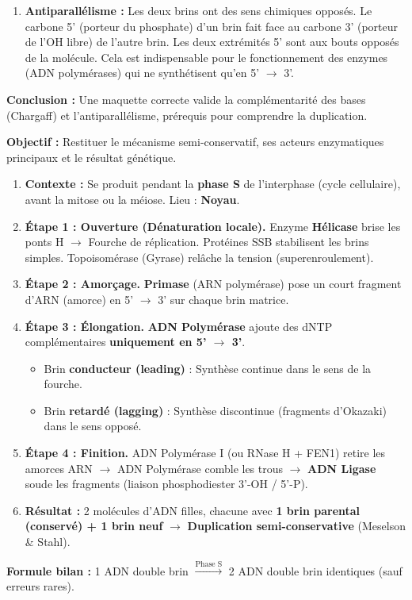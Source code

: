 \documentclass[11pt]{article}
\newcommand{\cle}[1]{{\popxbold\color{popdark}#1}}
\begin{document}
\begin{exoresolu}
\begin{enumerate}
        \item \textbf{Antiparallélisme :} Les deux brins ont des sens chimiques opposés. Le carbone 5' (porteur du phosphate) d'un brin fait face au carbone 3' (porteur de l'OH libre) de l'autre brin. Les deux extrémités 5' sont aux bouts opposés de la molécule. Cela est indispensable pour le fonctionnement des enzymes (ADN polymérases) qui ne synthétisent qu'en 5' $\rightarrow$ 3'.
    \end{enumerate}
    \textbf{Conclusion :} Une maquette correcte valide la complémentarité des bases (Chargaff) et l'antiparallélisme, prérequis pour comprendre la duplication.
\end{exoresolu}

\begin{methode}
    \textbf{Objectif :} Restituer le mécanisme \cle{semi-conservatif}, ses acteurs enzymatiques principaux et le résultat génétique.
    \begin{enumerate}
        \item \textbf{Contexte :} Se produit pendant la \textbf{phase S} de l'interphase (cycle cellulaire), avant la mitose ou la méiose. Lieu : \textbf{Noyau}.
        \item \textbf{Étape 1 : Ouverture (Dénaturation locale).} Enzyme \textbf{Hélicase} brise les ponts H $\rightarrow$ \cle{Fourche de réplication}. Protéines SSB stabilisent les brins simples. Topoisomérase (Gyrase) relâche la tension (superenroulement).
        \item \textbf{Étape 2 : Amorçage.} \textbf{Primase} (ARN polymérase) pose un court fragment d'ARN (amorce) en 5' $\rightarrow$ 3' sur chaque brin matrice.
        \item \textbf{Étape 3 : Élongation.} \textbf{ADN Polymérase} ajoute des dNTP complémentaires \textbf{uniquement en 5' $\rightarrow$ 3'}.
            \begin{itemize}
                \item Brin \textbf{conducteur (leading)} : Synthèse continue dans le sens de la fourche.
                \item Brin \textbf{retardé (lagging)} : Synthèse discontinue (\cle{fragments d'Okazaki}) dans le sens opposé.
            \end{itemize}
        \item \textbf{Étape 4 : Finition.} ADN Polymérase I (ou RNase H + FEN1) retire les amorces ARN $\rightarrow$ ADN Polymérase comble les trous $\rightarrow$ \textbf{ADN Ligase} soude les fragments (liaison phosphodiester 3'-OH / 5'-P).
        \item \textbf{Résultat :} 2 molécules d'ADN filles, chacune avec \textbf{1 brin parental (conservé) + 1 brin neuf} $\rightarrow$ \textbf{Duplication semi-conservative} (Meselson \& Stahl).
    \end{enumerate}
    \textbf{Formule bilan :} 1 ADN double brin $\xrightarrow{\text{Phase S}}$ 2 ADN double brin identiques (sauf erreurs rares).
\end{methode}
\end{document}
